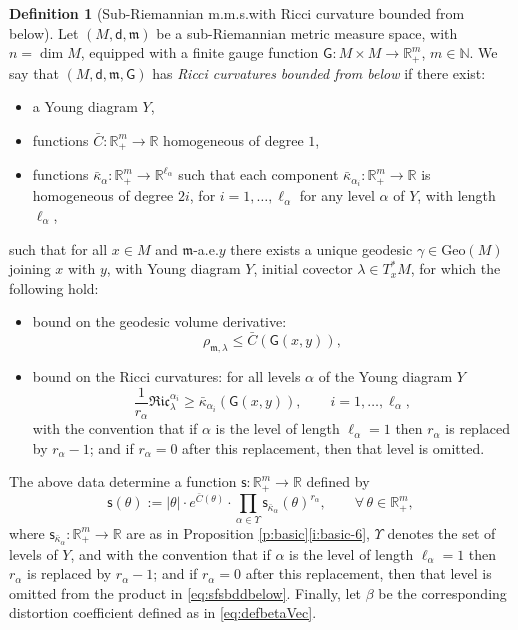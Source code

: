 \documentclass[11pt,a4paper]{article}
\theoremstyle{plain}
\theoremstyle{definition}
\newtheorem{definition}[theorem]{Definition}
\theoremstyle{remark}
\numberwithin{equation}{section}
\newcommand{\R}{\mathbb{R}} %
\newcommand{\N}{\mathbb{N}} %
\newcommand{\Geo}{\mathrm{Geo}}
\newcommand{\sfs}{\mathsf{s}}
\newcommand{\mm}{\mathfrak m}
\newcommand{\sfd}{\mathsf d}
\newcommand{\sfG}{\mathsf G}
\begin{document}
\begin{definition}[Sub-Riemannian m.m.s.\@ with Ricci curvature bounded from below]\label{def:srbddbelow}
Let $(M,\sfd,\mm)$ be a sub-Riemannian metric measure space, with $n=\dim M$, equipped with a finite gauge function $\sfG : M \times M \to \R^m_+$, $m\in \N$. We say that $(M,\sfd,\mm,\sfG)$ has \emph{Ricci curvatures bounded from below} if there exist:
\begin{itemize}
\item a Young diagram $Y$,
\item functions $\bar{C}: \R^m_+\to \R$ homogeneous of degree $1$,
\item functions $\bar{\kappa}_\alpha : \R^m_+ \to \R^{\ell_\alpha}$ such that each component $\bar{\kappa}_{\alpha_i} : \R^m_+\to \R$ is homogeneous of degree $2i$, for $i=1,\dots,\ell_{\alpha}$ for any level $\alpha$ of $Y$, with length $\ell_{\alpha}$,
\end{itemize}
such that for all $x\in M$ and $\mm$-a.e.\@ $y$ there exists a unique geodesic $\gamma \in \Geo(M)$ joining $x$ with $y$, with Young diagram $Y$, initial covector $\lambda \in T_x^*M$, for which the following hold:
\begin{itemize}
\item bound on the geodesic volume derivative:
\begin{equation}
\rho_{\mm,\lambda} \leq \bar{C}(\sfG(x,y)),
\end{equation}
\item bound on the Ricci curvatures: for all levels $\alpha$ of the Young diagram $Y$
\begin{equation}
\frac{1}{r_\alpha}\mathfrak{Ric}^{\alpha_i}_{\lambda} \geq \bar{\kappa}_{\alpha_i}(\sfG(x,y)), \qquad i=1,\dots,\ell_\alpha,
\end{equation}
with the convention that if $\alpha$ is the level of length $\ell_{\alpha}=1$ then $r_\alpha$ is replaced by $r_\alpha-1$; and if $r_\alpha =0$ after this replacement, then that level is omitted.
\end{itemize}
The above data determine a function $\sfs:\R^m_+\to \R$ defined by
\begin{equation}\label{eq:sfsbddbelow}
\sfs(\theta) := |\theta|\cdot e^{\bar{C}(\theta)}\cdot \prod_{\alpha\in\Upsilon} \sfs_{\bar{\kappa}_{\alpha}}(\theta)^{r_\alpha},\qquad \forall\, \theta \in \R^m_+,
\end{equation}
where $\sfs_{\bar{\kappa}_{\alpha}} :\R^m_+ \to \R$ are as in Proposition \ref{p:basic}\ref{i:basic-6}, $\Upsilon$ denotes the set of levels of $Y$, and with the convention that if $\alpha$ is the level of length $\ell_{\alpha}=1$ then $r_\alpha$ is replaced by $r_\alpha-1$; and if $r_\alpha =0$ after this replacement, then that level is omitted from the product in \eqref{eq:sfsbddbelow}. Finally, let $\beta$ be the corresponding distortion coefficient defined as in \eqref{eq:defbetaVec}.
\end{definition}
\end{document}

